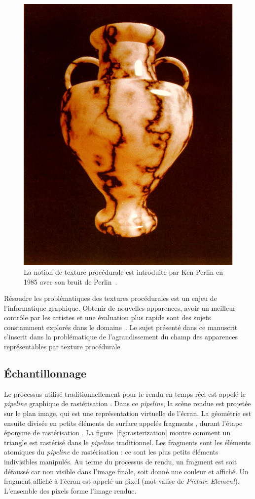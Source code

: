 \begin{figure}[h]
    \centering
    \includegraphics[width=.5\textwidth]{contenu/resources/images/perlin-noise}
    \caption[Bruit de Perlin]{La notion de texture procédurale est introduite par Ken Perlin en 1985 avec son bruit de Perlin~\cite{perlin_image_1985}.}
    \label{fig:perlin-noise}
\end{figure}

Résoudre les problématiques des textures procédurales est un enjeu de l'informatique graphique. Obtenir de nouvelles apparences, avoir un meilleur contrôle par les artistes et une évaluation plus rapide sont des sujets constamment explorés dans le domaine~\cite{heitz_high-performance_2018, tricard_procedural_2019, lutz_cyclostationary-gaussian_2021, baldi_differentiable_2023}. Le sujet présenté dans ce manuscrit s'inscrit dans la problématique de l'agrandissement du champ des apparences représentables par texture procédurale.

\subsection*{Échantillonnage}

Le processus utilisé traditionnellement pour le rendu en temps-réel est appelé le \og \textit{pipeline} graphique de rastérisation \fg. Dans ce \textit{pipeline}, la scène rendue est projetée sur le plan image, qui est une représentation virtuelle de l'écran. La géométrie est ensuite divisée en petits éléments de surface appelés \og fragments \fg, durant l'étape éponyme de \og rastérisation \fg. La figure~\ref{fig:rasterization} montre comment un triangle est rastérisé dans le \textit{pipeline} traditionnel. Les fragments sont les éléments atomiques du \textit{pipeline} de rastérisation : ce sont les plus petits éléments indivisibles manipulés. Au terme du processus de rendu, un fragment est soit défaussé car non visible dans l'image finale, soit donné une couleur et affiché. Un fragment affiché à l'écran est appelé un \og pixel \fg (mot-valise de \textit{Picture Element}). L'ensemble des pixels forme l'image rendue.


